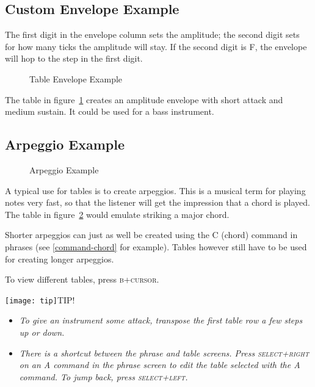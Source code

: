 \subsection{Custom Envelope Example}

The first digit in the envelope column sets the amplitude; the second digit sets for how many ticks the amplitude will stay.
If the second digit is F, the envelope will hop to the step in the first digit.

\begin{figure}[htpb]
	\begin{center}
	\end{center}
	\caption{Table Envelope Example}
	\label{fig:table-amp}
\end{figure}

The table in figure~\ref{fig:table-amp} creates an amplitude envelope with short attack and medium sustain. It could be used for a bass instrument.

\subsection{Arpeggio Example}

\begin{figure}[htpb]
	\begin{center}
	\end{center}
	\caption{Arpeggio Example}
	\label{fig:table-arp}
\end{figure}

A typical use for tables is to create arpeggios. This is a musical term for playing notes very fast, so that the listener will get the impression that a chord is played. The table in figure~\ref{fig:table-arp} would emulate striking a major chord.

Shorter arpeggios can just as well be created using the C (chord) command in phrases (see \ref{command-chord} for example). Tables however still have to be used for creating longer arpeggios.

To view different tables, press \textsc{b+cursor}.

\texttt{[image: tip]}TIP!
\begin{itemize}
	\item \textit{To give an instrument some attack, transpose the first table row a few steps up or down.}
	\item \textit{There is a shortcut between the phrase and table screens. Press \textsc{select+right} on an A command in the phrase screen to edit the table selected with the A command. To jump back, press \textsc{select+left}.}
\end{itemize}

